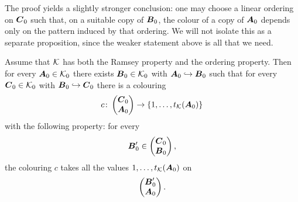 The proof yields a slightly stronger conclusion: one may choose a linear ordering on \(\boldsymbol{C}_0\) such that, on a suitable copy of \(\boldsymbol{B}_0\), the colour of a copy of \(\boldsymbol{A}_0\) depends only on the pattern induced by that ordering. We will not isolate this as a separate proposition, since the weaker statement above is all that we need.

\begin{proposition}
    \label{prop:ordering-property-lower-bound}
    Assume that \(\mathcal{K}\) has both the Ramsey property and the ordering property.
    Then for every \(\boldsymbol{A}_0\in\mathcal{K}_0\) there exists \(\boldsymbol{B}_0\in\mathcal{K}_0\) with
    \(\boldsymbol{A}_0\hookrightarrow\boldsymbol{B}_0\) such that for every \(\boldsymbol{C}_0\in\mathcal{K}_0\)
    with \(\boldsymbol{B}_0\hookrightarrow\boldsymbol{C}_0\) there is a colouring
    \[
        c\colon\begin{pmatrix}\boldsymbol{C}_0\\ \boldsymbol{A}_0\end{pmatrix}\to\{1,\dots,t_{\mathcal{K}}(\boldsymbol{A}_0)\}
    \]
    with the following property: for every
    \[
        \boldsymbol{B}_0'\in\begin{pmatrix}\boldsymbol{C}_0\\ \boldsymbol{B}_0\end{pmatrix},
    \]
    the colouring \(c\) takes all the values \(1,\dots,t_{\mathcal{K}}(\boldsymbol{A}_0)\) on
    \[
        \begin{pmatrix}\boldsymbol{B}_0'\\ \boldsymbol{A}_0\end{pmatrix}.
    \]
\end{proposition}

